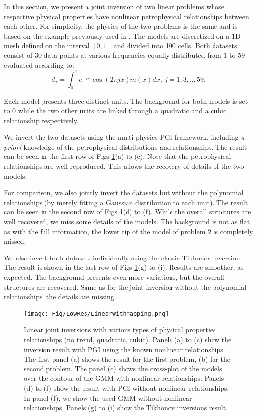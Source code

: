 \documentclass[extra, mreferee]{gji_joint} %
\begin{document}
In this section, we present a joint inversion of two linear problems whose respective physical properties have nonlinear petrophysical relationships between each other. For simplicity, the physics of the two problems is the same and is based on the example previously used in \citet{Li1996}. The models are discretized on a 1D mesh defined on the interval $[0, 1]$ and divided into 100 cells. Both datasets consist of $30$ data points at various frequencies equally distributed from $1$ to $59$ evaluated according to:
\begin{equation}
d_j = \int_0^1 e^{-jx}\cos(2\pi j x) m(x) dx, ~j=1, 3, .., 59.
\end{equation}

Each model presents three distinct units. The background for both models is set to $0$ while the two other units are linked through a quadratic and a cubic relationship respectively.

We invert the two datasets using the multi-physics PGI framework, including \textit{a priori} knowledge of the petrophysical distributions and relationships. The result can be seen in the first row of Figs \ref{fig:LinearWithMapping.png}(a) to (c). Note that the petrophysical relationships are well reproduced. This allows the recovery of details of the two models.

For comparison, we also jointly invert the datasets but without the polynomial relationships (by merely fitting a Gaussian distribution to each unit). The result can be seen in the second row of Figs \ref{fig:LinearWithMapping.png}(d) to (f). While the overall structures are well recovered, we miss some details of the models. The background is not as flat as with the full information, the lower tip of the model of problem $2$ is completely missed.

We also invert both datasets individually using the classic Tikhonov inversion. The result is shown in the last row of Figs \ref{fig:LinearWithMapping.png}(g) to (i). Results are smoother, as expected. The background presents even more variations, but the overall structures are recovered. Same as for the joint inversion without the polynomial relationships, the details are missing.

\begin{figure}
    \texttt{[image: Fig/LowRes/LinearWithMapping.png]}
    \caption{Linear joint inversions with various types of physical properties relationships (no trend, quadratic, cubic). Panels (a) to (c) show the inversion result with PGI using the known nonlinear relationships. The first panel (a) shows the result for the first problem, (b) for the second problem. The panel (c) shows the cross-plot of the models over the contour of the GMM with nonlinear relationships. Panels (d) to (f) show the result with PGI without nonlinear relationships. In panel (f), we show the used GMM without nonlinear relationships. Panels (g) to (i) show the Tikhonov inversions result.}
    \label{fig:LinearWithMapping.png}
\end{figure}
\end{document}
